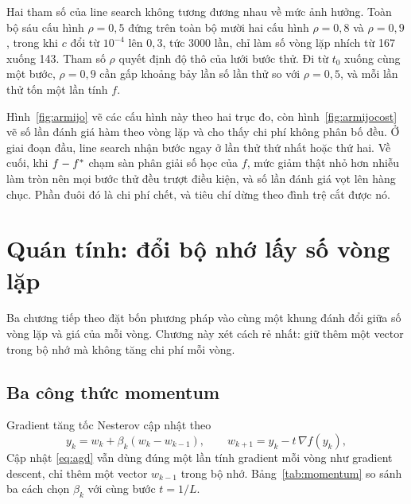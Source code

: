 \documentclass[12pt, a4paper, oneside]{report}
\theoremstyle{definition}
\begin{document}
Hai tham số của line search không tương đương nhau về mức ảnh hưởng. Toàn bộ sáu
cấu hình $\rho = 0{,}5$ đứng trên toàn bộ mười hai cấu hình $\rho = 0{,}8$ và
$\rho = 0{,}9$, trong khi $c$ đổi từ $10^{-4}$ lên $0{,}3$, tức 3000 lần, chỉ làm
số vòng lặp nhích từ 167 xuống 143. Tham số $\rho$ quyết định độ thô của lưới
bước thử. Đi từ $t_{0}$ xuống cùng một bước, $\rho = 0{,}9$ cần gấp khoảng bảy
lần số lần thử so với $\rho = 0{,}5$, và mỗi lần thử tốn một lần tính $f$.

Hình~\ref{fig:armijo} vẽ các cấu hình này theo hai trục đo, còn
hình~\ref{fig:armijocost} vẽ số lần đánh giá hàm theo vòng lặp và cho thấy chi
phí không phân bố đều. Ở giai đoạn đầu, line search nhận bước ngay ở lần thử thứ
nhất hoặc thứ hai. Về cuối, khi $f - f^{*}$ chạm sàn phân giải số học của $f$,
mức giảm thật nhỏ hơn nhiễu làm tròn nên mọi bước thử đều trượt điều kiện, và số
lần đánh giá vọt lên hàng chục. Phần đuôi đó là chi phí chết, và tiêu chí dừng
theo đình trệ cắt được nó.



\chapter{Quán tính: đổi bộ nhớ lấy số vòng lặp}\label{ch:momentum}

Ba chương tiếp theo đặt bốn phương pháp vào cùng một khung đánh đổi giữa số vòng
lặp và giá của mỗi vòng. Chương này xét cách rẻ nhất: giữ thêm một vector trong
bộ nhớ mà không tăng chi phí mỗi vòng.

\section{Ba công thức momentum}

Gradient tăng tốc Nesterov cập nhật theo
\begin{equation}\label{eq:agd}
  y_k = w_k + \beta_k (w_k - w_{k-1}), \qquad w_{k+1} = y_k - t\, \nabla f(y_k),
\end{equation}
Cập nhật \eqref{eq:agd} vẫn dùng đúng một lần tính gradient mỗi vòng như gradient descent, chỉ thêm một
vector $w_{k-1}$ trong bộ nhớ. Bảng~\ref{tab:momentum} so sánh ba cách chọn
$\beta_k$ với cùng bước $t = 1/L$.
\end{document}

